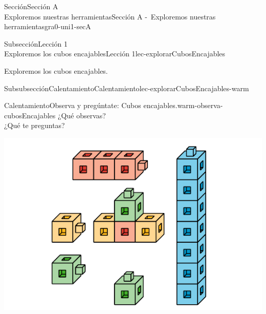 \clearpage
\setcounter{tocdepth}{2}
\renewcommand{\contentsname}{Tabla de contenido}
\tableofcontents
%
\typeout{************************************************}
\typeout{************************************************}
%
\begin{sectionptx}{Sección}{{\Large Sección A\\}Exploremos nuestras herramientas}{}{Sección A -~Exploremos nuestras herramientas}{}{}{gra0-uni1-secA}
%
%
\typeout{************************************************}
\typeout{************************************************}
%
\begin{subsectionptx}{Subsección}{{\normalsize Lección 1\\[-0.05cm]}Exploremos los cubos encajables}{}{Lección 1}{}{}{lec-explorarCubosEncajables}
\begin{introduction}{}%
Exploremos los cubos encajables.%
\end{introduction}%
%
%
\typeout{************************************************}
\typeout{************************************************}
%
\begin{subsubsectionptx}{Subsubsección}{Calentamiento}{}{Calentamiento}{}{}{lec-explorarCubosEncajables-warm}
\begin{exploration}{Calentamiento}{Observa y pregúntate: Cubos encajables.}{warm-observa-cubosEncajables}%
¿Qué observas?\\
¿Qué te preguntas?\begin{image}{0}{1}{0}{}%
\includegraphics[scale=1.5, max width=\linewidth, center]{external/svg-source/tikz-file-147993.pdf}

\end{image}
\end{exploration}
\end{subsubsectionptx}
\end{subsectionptx}
\end{sectionptx}
